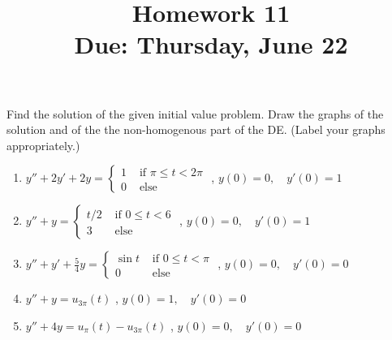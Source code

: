 


\title{Homework 11\\ Due: Thursday, June 22}


\maketitle

\thispagestyle{fancy}


Find the solution of the given initial value problem. Draw the graphs of the solution and of the the non-homogenous part of the DE. (Label your graphs appropriately.)

\vspace{2em}
\begin{enumerate}
	\item $ y'' + 2y' + 2y = \begin{cases} 1 &\mbox{ if } \pi \le t < 2 \pi \\ 0& \mbox{ else} \end{cases}$ , $ y(0) = 0, \quad y'(0) = 1 $ \\
	\item $ y'' + y = \begin{cases} t/2 &\mbox{ if } 0 \le t < 6 \\ 3& \mbox{ else} \end{cases}$ , $ y(0) = 0,\quad y'(0) = 1 $ \\
	\item $ y'' + y' + \frac{5}{4}y = \begin{cases} \sin t &\mbox{ if } 0 \le t < \pi \\ 0& \mbox{ else} \end{cases}$ , $ y(0) = 0,\quad y'(0) = 0 $ \\
	\item $ y'' + y = u_{3\pi}(t) $ , $ y(0) = 1,\quad y'(0) = 0 $  \\
	\item $ y'' + 4y = u_\pi( t) - u_{3\pi}(t) $ , $ y(0) = 0,\quad y'(0) = 0 $  \\

\end{enumerate}



